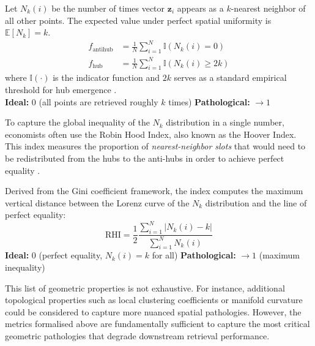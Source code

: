 \begin{metricbox}
Let $N_k(i)$ be the number of times vector $\mathbf{z}_i$ appears as a $k$-nearest neighbor of all other points. The expected value under perfect spatial uniformity is $\mathbb{E}[N_k] = k$. 
\begin{align}
    f_{\mathrm{antihub}} &= \frac{1}{N} \sum_{i=1}^N \mathbb{I}(N_k(i) = 0) 
    \label{met:antihub_fraction} \\
    f_{\mathrm{hub}} &= \frac{1}{N} \sum_{i=1}^N \mathbb{I}(N_k(i) \geq 2k)
    \label{met:hub_fraction}
\end{align}
where $\mathbb{I}(\cdot)$ is the indicator function and $2k$ serves as a standard empirical threshold for hub emergence \cite{feldbauer2019comprehensive}. \\
\textbf{Ideal:} $0$ (all points are retrieved roughly $k$ times) \quad \textbf{Pathological:} $\to 1$
\end{metricbox}

To capture the global inequality of the $N_k$ distribution in a single number, economists often use the Robin Hood Index, also known as the Hoover Index. This index measures the proportion of \emph{nearest-neighbor slots} that would need to be redistributed from the hubs to the anti-hubs in order to achieve perfect equality \cite{feldbauer_fast_2018}.

\begin{metricbox}
Derived from the Gini coefficient framework, the index computes the maximum vertical distance between the Lorenz curve of the $N_k$ distribution and the line of perfect equality:
\begin{equation}
    \text{RHI} = \frac{1}{2} \frac{\sum_{i=1}^N |N_k(i) - k|}{\sum_{i=1}^N N_k(i)}
    \label{met:robin_hood}
\end{equation}
\textbf{Ideal:} $0$ (perfect equality, $N_k(i) = k$ for all) \quad \textbf{Pathological:} $\to 1$ (maximum inequality)
\end{metricbox}

This list of geometric properties is not exhaustive. For instance, additional topological properties such as local clustering coefficients or manifold curvature could be considered to capture more nuanced spatial pathologies. However, the metrics formalised above are fundamentally sufficient to capture the most critical geometric pathologies that degrade downstream retrieval performance.